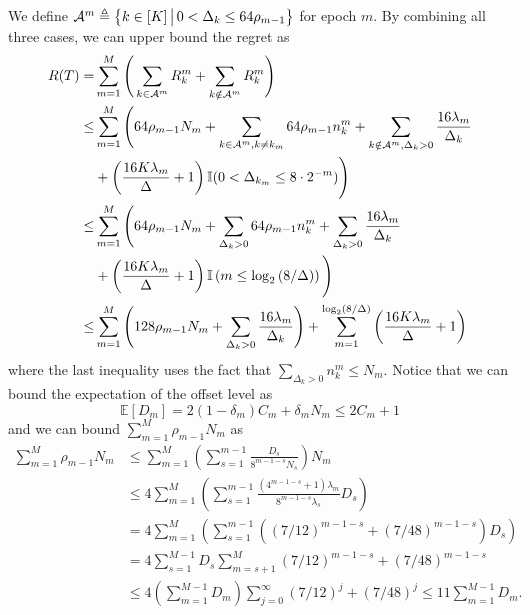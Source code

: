 We define ${\mathcal{A}}^m\triangleq\left\{ k\in[K]\,\big|\,0<\Delta_k\le 64\rho_{m-1} \right\}$ for epoch $m$. By combining all three cases, we can upper bound the regret as
\begin{equation}\label{eq:mab-regret}
\begin{split}
R(T)=&\sum_{m=1}^M\Bigg(\sum_{k \in \mathcal{A}^m} R_k^m + \sum_{k \notin \mathcal{A}^m} R_k^m\Bigg)\\    
\le& \sum_{m=1}^M\Bigg( 64\rho_{m-1}N_m+\sum_{k \in \mathcal{A}^m,k\neq k_m} 64\rho_{m-1}n_k^m + \sum_{k \notin \mathcal{A}^m, \Delta_k>0} \frac{16\lambda_m}{\Delta_k}\\
&+ \left(\frac{16K\lambda_m}{\Delta} + 1\right){\mathbb{I}}(0<\Delta_{k_m} \le 8 \cdot 2^{-m}) \Bigg)\\ 
\le& \sum_{m=1}^M\Bigg( 64\rho_{m-1}N_m+\sum_{\Delta_k>0} 64\rho_{m-1}n_k^m + \sum_{\Delta_k>0} \frac{16\lambda_m}{\Delta_k} \\
&+ \left(\frac{16K\lambda_m}{\Delta} + 1\right){\mathbb{I}}\left(m\le \log_2\left(8/\Delta\right)\right)\Bigg)\\ 
\le& \sum_{m=1}^M\Bigg( 128\rho_{m-1}N_m + \sum_{\Delta_k>0} \frac{16\lambda_m}{\Delta_k}\Bigg) 
+ \sum_{m=1}^{\log_2(8/\Delta)}\left(\frac{16K\lambda_m}{\Delta} + 1\right)
\end{split}
\end{equation}
where the last inequality uses the fact that $\sum_{\Delta_k>0} n_k^m\le N_m$. Notice that we can bound the expectation of the offset level as
\[\mathbb{E}[D_m] = 2(1-\delta_m)C_m + \delta_m N_m \leq 2C_m + 1\]
and we can bound $\sum_{m=1}^M \rho_{m-1} N_m$ as
\begin{equation}\label{eq:mab-rho}
    \begin{split}
        \sum_{m=1}^M \rho_{m-1} N_m
        &\leq \sum_{m=1}^M \left(\sum_{s=1}^{m-1}\frac{D_s}{8^{m-1-s}N_s}\right)N_m \\
        &\leq 4\sum_{m=1}^M \left(\sum_{s=1}^{m-1}\frac{(4^{m-1-s} + 1)\lambda_m}{8^{m-1-s}\lambda_s}D_s\right) \\
        &= 4\sum_{m=1}^M \left(\sum_{s=1}^{m-1}((7/12)^{m-1-s} + (7/48)^{m-1-s})D_s\right) \\
        &= 4\sum_{s=1}^{M-1} D_s \sum_{m=s+1}^M (7/12)^{m-1-s} + (7/48)^{m-1-s}\\
        &\leq 4\left(\sum_{m=1}^{M-1} D_m\right)\sum_{j=0}^{\infty} \left(7/12\right)^{j} + \left(7/48\right)^{j} 
        \leq 11\sum_{m=1}^{M-1} D_m.
    \end{split}
\end{equation}
